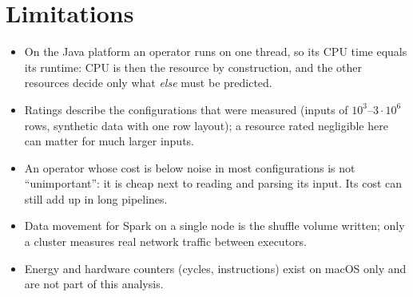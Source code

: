 \documentclass[11pt,a4paper]{article}
\begin{document}
\section{Limitations}
\begin{itemize}\itemsep2pt
\item On the Java platform an operator runs on one thread, so its CPU time equals its runtime: CPU is then the resource by construction, and the other resources decide only what \emph{else} must be predicted.
\item Ratings describe the configurations that were measured (inputs of $10^3$--$3\cdot10^6$ rows, synthetic data with one row layout); a resource rated negligible here can matter for much larger inputs.
\item An operator whose cost is below noise in most configurations is not ``unimportant'': it is cheap next to reading and parsing its input. Its cost can still add up in long pipelines.
\item Data movement for Spark on a single node is the shuffle volume written; only a cluster measures real network traffic between executors.
\item Energy and hardware counters (cycles, instructions) exist on macOS only and are not part of this analysis.
\end{itemize}
\end{document}
